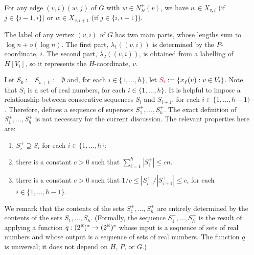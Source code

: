 \documentclass{patmorin}
\makeatletter
\renewcommand{\le}{\leqslant}
\newcommand{\defin}[1]{\emph{\textcolor{brightmaroon}{#1}}}
\def\mathcolor#1#{\@mathcolor{#1}}
\def\@mathcolor#1#2#3{%
  \protect\leavevmode
  \begingroup
    \color#1{#2}#3%
  \endgroup
}
\newcommand{\mathdefin}[1]{\mathcolor{brightmaroon}{#1}}
\makeatother
\begin{document}
  \begin{obs}\label{x_v_i_sufficient}
    For any edge $(v,i)(w,j)$ of $G$ with $w\in N^+_H(v)$, we have $w\in X_{v,i}$ (if $j\in\{i-1,i\}$) or $w\in X_{v,i+1}$ (if $j\in\{i,i+1\}$).
  \end{obs}




  The label of any vertex $(v,i)$ of $G$ has two main parts, whose lengths sum to $\log n+o(\log n)$.
  The first part, $\lambda_1((v,i))$ is determined by the $P$-coordinate, $i$.
  The second part, $\lambda_2((v,i))$, is obtained from a labelling of $H[V_i]$, so it represents the $H$-coordinate, $v$.

  Let $S_0:=S_{h+1}:=\emptyset$ and,
  for each $i\in\{1,\ldots,h\}$, let $\mathdefin{S_i}:=\{x_f(v):v\in V_i\}$.
  Note that $S_i$ is a set of real numbers, for each $i\in\{1,\ldots,h\}$.
  It is helpful to impose a relationship between consecutive sequences $S_i$ and $S_{i+1}$, for each $i\in\{1,\ldots,h-1\}$. Therefore, \cite{dujmovic.esperet.ea:adjacency} defines a sequence of supersets \defin{$S^+_1,\ldots,S^+_h$}. The exact definition of $S^+_1,\ldots,S^+_h$ is not necessary for the current discussion.
  The relevant properties here are:
  \begin{enumerate}[nosep,label=(\alph*)]
      \item\label{plus_superset} $S^+_i\supseteq S_i$ for each $i\in\{1,\ldots,h\}$;
      \item\label{plus_size} there is a constant $c>0$ such that $\sum_{i=1}^h |S^+_i|\le cn$.
      \item\label{plus_ratio} there is a constant $c>0$ such that
      $1/c\le |S^+_i|/|S^+_{i+1}|\le c$, for each $i\in\{1,\ldots,h-1\}$.
  \end{enumerate}
  We remark that the contents of the sets $S^+_1,\ldots,S^+_h$ are entirely determined by the contents of the sets $S_1,\ldots,S_h$.
  (Formally, the sequence $S^+_1,\ldots,S^+_h$ is the result of applying a function $q:(2^{\mathbb{R}})^*\to (2^{\mathbb{R}})^*$ whose input is a sequence of sets of real numbers and whose output is a sequence of sets of real numbers. The function $q$ is universal; it does not depend on $H$, $P$, or $G$.)
\end{document}
